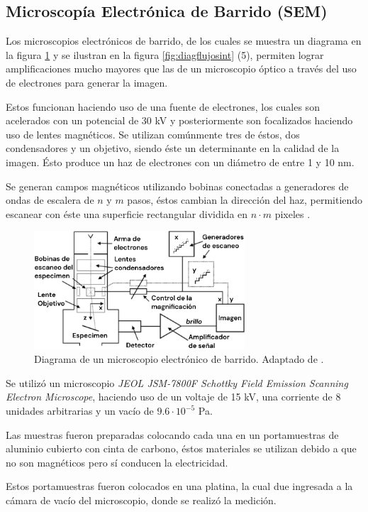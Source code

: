 \documentclass[../main.tex]{subfiles}
\begin{document}
\subsection{Microscopía Electrónica de Barrido (SEM)}
Los microscopios electrónicos de barrido, de los cuales se muestra un diagrama en la figura \ref{fig:semdiag} y se ilustran en la figura \ref{fig:diagflujosint} (5), permiten lograr amplificaciones mucho mayores que las de un microscopio óptico a través del uso de electrones para generar la imagen.

Estos funcionan haciendo uso de una fuente de electrones, los cuales son acelerados con un potencial de 30 kV y posteriormente son focalizados haciendo uso de lentes magnéticos. Se utilizan comúnmente tres de éstos, dos condensadores y un objetivo, siendo éste un determinante en la calidad de la imagen. Ésto produce un haz de electrones con un diámetro de entre 1 y 10 nm.

Se generan campos magnéticos utilizando bobinas conectadas a generadores de ondas de escalera de $n$ y $m$ pasos, éstos cambian la dirección del haz, permitiendo escanear con éste una superficie rectangular dividida en $n\cdot m$ pixeles \cite{Egerton2005}.
\begin{figure}[H]
    \centering
    \includegraphics[width=0.7\textwidth]{fig/semdiag.png}
    \caption{Diagrama de un microscopio electrónico	de barrido. Adaptado de \cite{Egerton2005}.}
    \label{fig:semdiag}
\end{figure}
Se utilizó un microscopio \textit{JEOL JSM-7800F Schottky Field Emission Scanning Electron Microscope}, haciendo uso de un voltaje de 15 kV, una corriente de 8 unidades arbitrarias y un vacío de $9.6\cdot10^{-5}$ Pa.

Las muestras fueron preparadas colocando cada una en un portamuestras de aluminio cubierto con cinta de carbono, éstos materiales se utilizan debido a que no son magnéticos pero sí conducen la electricidad.

Estos portamuestras fueron colocados en una platina, la cual due ingresada a la cámara de vacío del microscopio, donde se realizó la medición. 
\end{document}
